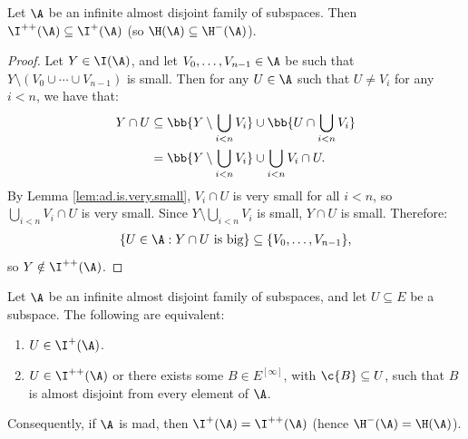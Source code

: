 \documentclass[11pt,reqno]{amsart}
\begin{document}
\begin{lemma}
\label{lem:plusplus.in.plus}
    Let $\A$ be an infinite almost disjoint family of subspaces. Then $\I^{++}(\A) \subseteq \I^+(\A)$ (so $\H(\A) \subseteq \H^-(\A)$).
\end{lemma}

\begin{proof}
    Let $Y \in \I(\A)$, and let $V_0,\dots,V_{n-1} \in \A$ be such that $Y \setminus (V_0 \cup \cdots \cup V_{n-1})$ is small. Then for any $U \in \A$ such that $U \neq V_i$ for any $i < n$, we have that:
    \begin{align*}
        Y \cap U &\subseteq \bb{Y \setminus \bigcup_{i<n} V_i} \cup \bb{U \cap \bigcup_{i<n} V_i} \\
        &= \bb{Y \setminus \bigcup_{i<n} V_i} \cup \bigcup_{i<n} V_i \cap U.
    \end{align*}
    By Lemma \ref{lem:ad.is.very.small}, $V_i \cap U$ is very small for all $i < n$, so $\bigcup_{i<n} V_i \cap U$ is very small. Since $Y \setminus \bigcup_{i<n} V_i$ is small, $Y \cap U$ is small. Therefore:
    \begin{align*}
        \{U \in \A : Y \cap U \text{ is big}\} \subseteq \{V_0,\dots,V_{n-1}\},
    \end{align*}
    so $Y \notin \I^{++}(\A)$. 
\end{proof}

\begin{lemma}
\label{lem:I^+(A).dichotomy}
    Let $\A$ be an infinite almost disjoint family of subspaces, and let $U \subseteq E$ be a subspace. The following are equivalent:
    \begin{enumerate}
        \item $U \in \I^+(\A)$.

        \item $U \in \I^{++}(\A)$ or there exists some $B \in E^{[\infty]}$, with $\c{B} \subseteq U$, such that $B$ is almost disjoint from every element of $\A$.
    \end{enumerate}
    Consequently, if $\A$ is mad, then $\I^+(\A) = \I^{++}(\A)$ (hence $\H^-(\A) = \H(\A)$).
\end{lemma}
\end{document}
